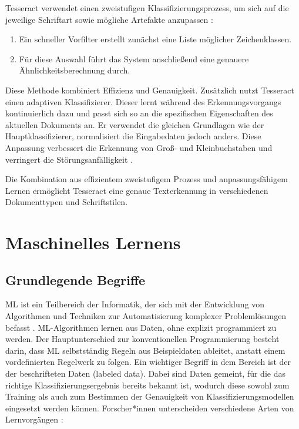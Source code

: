 Tesseract verwendet einen zweistufigen Klassifizierungsprozess, um sich auf die jeweilige Schriftart sowie mögliche Artefakte anzupassen \parencite{SmithR_2007_AOot}:

\begin{enumerate}
	\item Ein schneller Vorfilter erstellt zunächst eine Liste möglicher Zeichenklassen.
	\item Für diese Auswahl führt das System anschließend eine genauere Ähnlichkeitsberechnung durch.
\end{enumerate}

Diese Methode kombiniert Effizienz und Genauigkeit.
Zusätzlich nutzt Tesseract einen adaptiven Klassifizierer. Dieser lernt während des Erkennungsvorgangs kontinuierlich dazu und passt sich so an die spezifischen Eigenschaften des aktuellen Dokuments an. Er verwendet die gleichen Grundlagen wie der Hauptklassifizierer, normalisiert die Eingabedaten jedoch anders. Diese Anpassung verbessert die Erkennung von Groß- und Kleinbuchstaben und verringert die Störungsanfälligkeit \parencite{SmithR_2007_AOot}.

Die Kombination aus effizientem zweistufigem Prozess und anpassungsfähigem Lernen ermöglicht Tesseract eine genaue Texterkennung in verschiedenen Dokumenttypen und Schriftstilen.

\section{Maschinelles Lernens}
\label{sec:grundlagen-des-maschinellen-lernens}

\subsection{Grundlegende Begriffe}
\label{subsec:grundlegende-begriffe}

\gls{ML} ist ein Teilbereich der Informatik, der sich mit der Entwicklung von Algorithmen und Techniken zur Automatisierung komplexer Problemlösungen befasst \parencite{RebalaGopinath2019AItM}. \gls{ML}-Algorithmen lernen aus Daten, ohne explizit programmiert zu werden. Der Hauptunterschied zur konventionellen Programmierung besteht darin, dass \gls{ML} selbstständig Regeln aus Beispieldaten ableitet, anstatt einem vordefinierten Regelwerk zu folgen.
Ein wichtiger Begriff in dem Bereich ist der der beschrifteten Daten (labeled data). Dabei sind Daten gemeint, für die das richtige Klassifizierungsergebnis bereits bekannt ist, wodurch diese sowohl zum Training als auch zum Bestimmen der Genauigkeit von Klassifizierungsmodellen eingesetzt werden können.
Forscher*innen unterscheiden verschiedene Arten von Lernvorgängen \parencite{RebalaGopinath2019AItM, jordan2015machine}:

